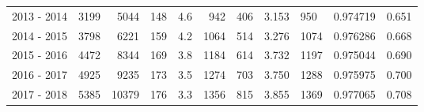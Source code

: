 \begin{tabular}{lrrrrrrrllr}
2013 - 2014 &     3199 &     5044 &               148 &               4.6 &                     942 &                        406 &       3.153 &           950 &   0.974719 &             0.651 \\
2014 - 2015 &     3798 &     6221 &               159 &               4.2 &                    1064 &                        514 &       3.276 &          1074 &   0.976286 &             0.668 \\
2015 - 2016 &     4472 &     8344 &               169 &               3.8 &                    1184 &                        614 &       3.732 &          1197 &   0.975044 &             0.690 \\
2016 - 2017 &     4925 &     9235 &               173 &               3.5 &                    1274 &                        703 &       3.750 &          1288 &   0.975975 &             0.700 \\
2017 - 2018 &     5385 &    10379 &               176 &               3.3 &                    1356 &                        815 &       3.855 &          1369 &   0.977065 &             0.708 \\
\bottomrule
\end{tabular}
